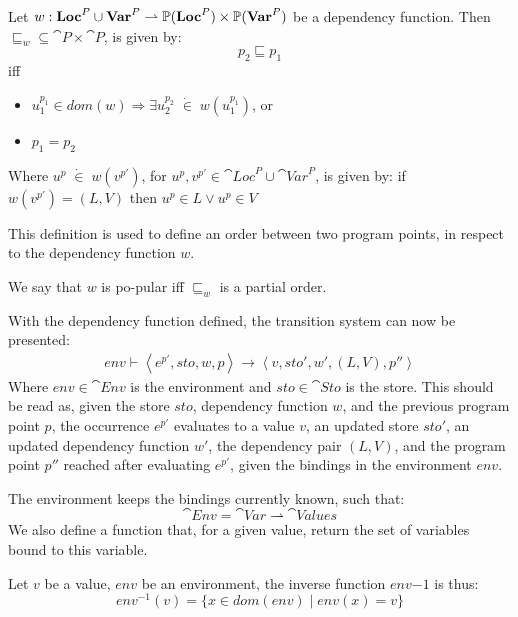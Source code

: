\documentclass[../../master.tex]{subfiles}
\begin{document}
\begin{definition}[$\sqsubseteq_w$]\label{def:popular}
	Let $w:\textbf{Loc}^P\cup\textbf{Var}^P\rightharpoonup\mathbb{P}(\textbf{Loc}^P)\times\mathbb{P}(\textbf{Var}^P)$ be a dependency function.
	Then $\sqsubseteq_w\subseteq\cat{P}\times\cat{P}$, is given by:
	$$p_2\sqsubseteq p_1$$
	iff
	\begin{itemize}
		\item $u_1^{p_1}\in dom(w)\Rightarrow\exists u_2^{p_2}\;\dot{\in}\; w(u_1^{p_1})$, or
		\item $p_1=p_2$
	\end{itemize}
	Where $u^{p}\;\dot{\in}\;w(v^{p'})$, for $u^p,v^{p'}\in\cat{Loc}^P\cup\cat{Var}^P$, is given by:
	if $w(v^{p'})=(L,V)$ then $u^{p}\in L\vee u^{p}\in V$
\end{definition}

This definition is used to define an order between two program points, in respect to the dependency function $w$.

\begin{definition}
	We say that $w$ is po-pular iff $\sqsubseteq_w$ is a partial order.
\end{definition}

With the dependency function defined, the transition system can now be presented:
\begin{align*}
env\vdash\left\langle e^{p'},sto,w,p\right\rangle\rightarrow\left\langle v,sto',w',(L,V),p''\right\rangle
\end{align*}
Where $env\in\cat{Env}$ is the environment and $sto\in\cat{Sto}$ is the store.
This should be read as, given the store $sto$, dependency function $w$, and the previous program point $p$, the occurrence $e^{p'}$ evaluates to a value $v$, an updated store $sto'$, an updated dependency function $w'$, the dependency pair $(L,V)$, and the program point $p''$ reached after evaluating $e^{p'}$, given the bindings in the environment $env$.

The environment keeps the bindings currently known, such that:
$$\cat{Env}=\cat{Var}\rightharpoonup\cat{Values}$$
We also define a function that, for a given value, return the set of variables bound to this variable.
\begin{definition}
	Let $v$ be a value, $env$ be an environment, the inverse function $env{-1}$ is thus:
	$$env^{-1}(v)=\{x\in dom(env)\mid env(x)=v\}$$
\end{definition}
\end{document}
